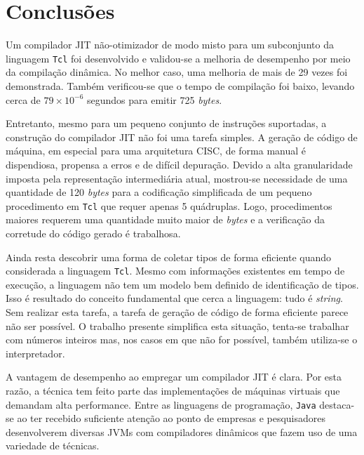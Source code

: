 \chapter{Conclusões}
\label{conclusao}


Um compilador JIT não-otimizador de modo misto para um subconjunto da
linguagem \texttt{Tcl} foi
desenvolvido e validou-se a melhoria de desempenho por meio da
compilação dinâmica. No melhor caso, uma melhoria de mais de 29 vezes
foi demonstrada. Também verificou-se que o tempo
de compilação foi baixo, levando cerca de $79 \times 10^{-6}$
segundos para emitir 725 \textit{bytes}.

Entretanto, mesmo para um pequeno conjunto de
instruções suportadas, a construção do compilador JIT não
foi uma tarefa simples. A geração de código de máquina, em especial
para uma arquitetura CISC, de forma manual é dispendiosa, propensa a
erros e de difícil depuração. Devido a alta
granularidade imposta pela representação intermediária atual,
mostrou-se necessidade de uma quantidade de 120 \textit{bytes}
para a codificação simplificada de um pequeno procedimento em
\texttt{Tcl} que requer apenas 5 quádruplas.
Logo, procedimentos maiores requerem uma quantidade
muito maior de \textit{bytes} e a
verificação da corretude do código gerado é trabalhosa.

Ainda resta descobrir uma forma de coletar tipos de forma eficiente
quando considerada a linguagem \texttt{Tcl}. Mesmo com informações
existentes em tempo de execução, a linguagem não tem um modelo bem
definido de identificação de tipos. Isso é resultado do conceito
fundamental que cerca a linguagem: tudo é \textit{string}. Sem
realizar esta tarefa, a tarefa de
geração de código de forma eficiente parece não ser possível.
O trabalho presente simplifica esta situação, tenta-se trabalhar com
números inteiros mas, nos casos em que não for possível, também
utiliza-se o interpretador.


A vantagem de desempenho ao empregar um compilador JIT é
clara. Por esta razão, a técnica tem feito parte das implementações de
máquinas virtuais que demandam alta performance. Entre as linguagens de
programação, \texttt{Java} destaca-se
ao ter recebido suficiente atenção ao ponto de empresas e
pesquisadores desenvolverem diversas JVMs com compiladores
dinâmicos que fazem uso de uma variedade de técnicas.

